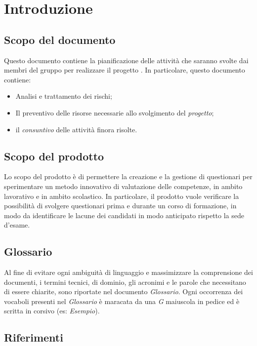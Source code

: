 \section{Introduzione}
\subsection{Scopo del documento}
Questo documento contiene la pianificazione delle attività che saranno svolte dai membri del gruppo \textit{\gruppo} per realizzare il
progetto \textit{\progetto}. In particolare, questo documento contiene:

	\begin{itemize}
		\item Analisi e trattamento dei rischi;
		\item Il preventivo delle risorse necessarie allo svolgimento del \textit{progetto};
		\item il \textit{consuntivo} delle attività finora risolte.
	\end{itemize}
	
\subsection{Scopo del prodotto}
Lo scopo del prodotto è di permettere la creazione e la gestione di questionari per sperimentare un metodo innovativo di valutazione delle competenze, in ambito lavorativo e in ambito scolastico. In particolare, il prodotto vuole verificare la possibilità di svolgere questionari prima e durante un corso di formazione, in modo da identificare le lacune dei candidati in modo anticipato rispetto la sede d'esame.
\subsection{Glossario}
Al fine di evitare ogni ambiguità di linguaggio e massimizzare la comprensione dei documenti, i termini tecnici, di dominio, gli acronimi e le parole che necessitano di essere chiarite, sono riportate nel documento \textit{Glossario}. Ogni occorrenza dei vocaboli presenti nel \textit{Glossario} è maracata da una \textit{G} maiuscola in pedice ed è scritta in corsivo (es: \textit{Esempio}).
\subsection{Riferimenti}

